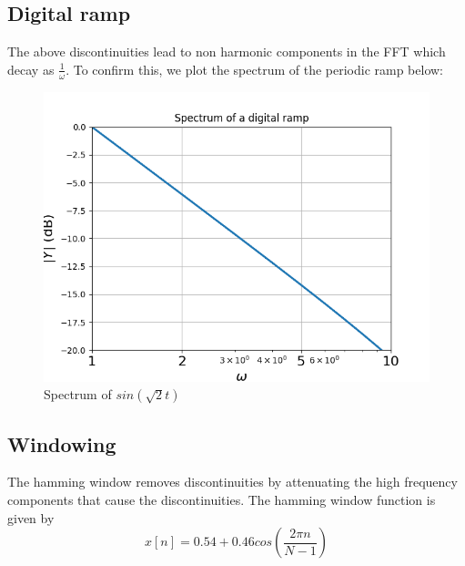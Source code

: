\documentclass{article}
\begin{document}
\subsection{Digital ramp}

The above discontinuities lead to  non harmonic components in the FFT which decay as \(\frac{1}{\omega}\). To confirm
this, we plot the spectrum of the periodic ramp below:
\begin{figure}[h!]
\centering
\includegraphics[scale=0.5]{Figure_4.png}
\caption{Spectrum of $sin(\sqrt{2}t)$}
\label{fig:universe}
\end{figure}

\subsection{Windowing}
The hamming window removes discontinuities by attenuating the high frequency components that cause the discontinuities.
The hamming window function is given by
\begin{equation}
    x[n] = 0.54 + 0.46cos(\frac{2\pi n}{N-1})
\end{equation}
\end{document}

